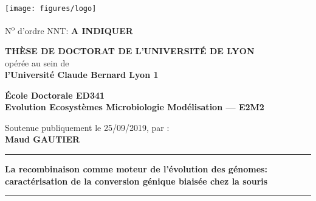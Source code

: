 



\setlength{\parindent}{0pt}
\thispagestyle{empty}


\begin{center}
\texttt{[image: figures/logo]} %
\end{center}


\fontsize{11pt}{13pt}\selectfont
N\textsuperscript{o} d'ordre NNT: \textbf{A INDIQUER}%

\vspace{1cm}

\begin{center}
\fontsize{14pt}{16pt}\selectfont
\textbf{\uppercase{Thèse de doctorat de l'université de Lyon}}\\
\fontsize{12pt}{14pt}\selectfont
opérée au sein de\\
\textbf{l'Université Claude Bernard Lyon 1}

\vspace{0.5cm}

\textbf{École Doctorale ED341\\%
Evolution Ecosyst\`emes Microbiologie Modélisation — E2M2}%

\vspace{0.5cm}



\vspace{1.5cm}

Soutenue publiquement le 25/09/2019, par :\\
\fontsize{14pt}{16pt}\selectfont
\textbf{Maud GAUTIER}

\vspace{1.5cm} %

\rule[20pt]{\textwidth}{0.5pt}

\fontsize{25pt}{28pt}\selectfont
\textbf{La recombinaison comme moteur de l'\'evolution des g\'enomes: caract\'erisation de la conversion g\'enique biais\'ee chez la souris}

\rule{\textwidth}{0.5pt}

\vspace{2cm} %
\end{center}

